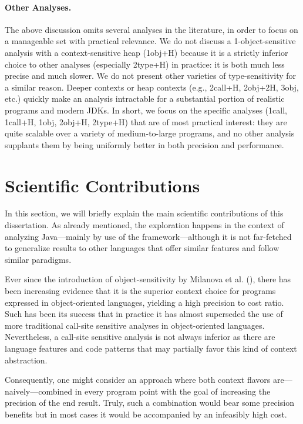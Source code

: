 \paragraph*{Other Analyses.}
The above discussion omits several analyses in the literature, in order to focus on a manageable set with practical relevance. We do not discuss a 1-object-sensitive analysis with a context-sensitive heap (1obj+H) because it is a strictly inferior choice to other analyses (especially 2type+H) in practice: it is both much less precise and much slower. We do not present other varieties of type-sensitivity for a similar reason. Deeper contexts or heap contexts (e.g., 2call+H, 2obj+2H, 3obj, etc.) quickly make an analysis intractable for a substantial portion of realistic programs and modern JDKs. In short, we focus on the specific analyses (1call, 1call+H, 1obj, 2obj+H, 2type+H) that are of most practical interest: they are quite scalable over a variety of medium-to-large programs, and no other analysis supplants them by being uniformly better in both precision and performance.


\section{Scientific Contributions}

In this section, we will briefly explain the main scientific contributions of this dissertation. As already mentioned, the exploration happens in the context of analyzing Java---mainly by use of the \doop{} framework---although it is not far-fetched to generalize results to other languages that offer similar features and follow similar paradigms.

Ever since the introduction of object-sensitivity by Milanova et al. (\todo{}), there has been increasing evidence that it is the superior context choice for programs expressed in object-oriented languages, yielding a high precision to cost ratio. Such has been its success that in practice it has almost superseded the use of more traditional call-site sensitive analyses in object-oriented languages. Nevertheless, a call-site sensitive analysis is not always inferior as there are language features and code patterns that may partially favor this kind of context abstraction.

Consequently, one might consider an approach where both context flavors are---naively---combined in every program point with the goal of increasing the precision of the end result. Truly, such a combination would bear some precision benefits but in most cases it would be accompanied by an infeasibly high cost.

